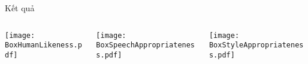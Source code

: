 \begin{frame}{Kết quả}
	\begin{columns}
	\begin{column}{0.33\textwidth}
		\texttt{[image: BoxHumanLikeness.pdf]}
	\end{column}
	
	\begin{column}{0.33\textwidth}
		\texttt{[image: BoxSpeechAppropriateness.pdf]}
	\end{column}
	
	\begin{column}{0.33\textwidth}
		\texttt{[image: BoxStyleAppropriateness.pdf]}
	\end{column}
\end{columns}

%



\end{frame}

